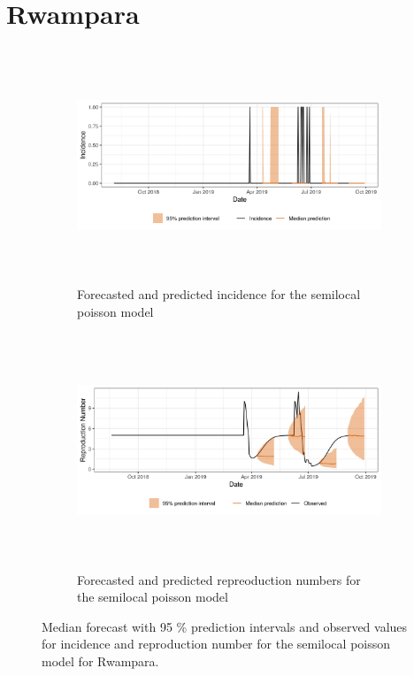  \section{ Rwampara }\begin{figure}[H]\begin{subfigure}{\textwidth}  \centering  \includegraphics[width=0.9\linewidth, height=7cm]{../output/Rwampara_predictions.png}  \caption{Forecasted and predicted incidence for the semilocal poisson model}\end{subfigure}

\begin{subfigure}{\textwidth}  \centering  \includegraphics[width=0.9\linewidth, height=7cm]{../output/Rwampara_Rs.png}  \caption{Forecasted and predicted repreoduction numbers for the semilocal poisson model}\end{subfigure}  \caption{Median forecast with 95 \% prediction intervals and observed values for incidence and reproduction number for the semilocal poisson model for Rwampara.}\end{figure}

